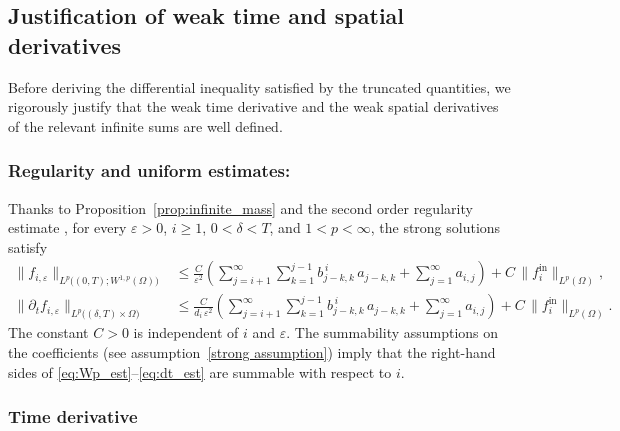 \documentclass[a4paper,12pt,reqno]{amsart}
\theoremstyle{plain}
\numberwithin{equation}{section}
\begin{document}
	\subsection{Justification of weak time and spatial derivatives}
	
	Before deriving the differential inequality satisfied by the truncated
	quantities, we rigorously justify that the weak time derivative and the weak
	spatial derivatives of the relevant infinite sums are well defined.
	
	\subsubsection*{Regularity and uniform estimates:}
	
	Thanks to Proposition~\ref{prop:infinite_mass} and the second order regularity estimate \cite{quittner2007}, for every $\varepsilon>0$,
	$i\ge1$, $0<\delta<T$, and $1<p<\infty$, the strong solutions satisfy
	\begin{align}
		\label{eq:Wp_est}
		\| f_{i,\varepsilon} \|_{L^p\!\big((0,T); W^{1,p}(\Omega)\big)}
		&\le 
		\frac{C}{\varepsilon^{2}}
		\left(
		\sum_{j=i+1}^{\infty}\sum_{k=1}^{j-1}
		b_{j-k,k}^{\,i}\, a_{j-k,k}
		+
		\sum_{j=1}^{\infty} a_{i,j}
		\right)+C\,\| f_i^{\mathrm{in}} \|_{L^{p}(\Omega)},
		\\[1ex]
		\label{eq:dt_est}
		\| \partial_t f_{i,\varepsilon} \|_{L^{p}\!\big((\delta,T)\times\Omega\big)}
		&\le
		\frac{C}{d_i\,\varepsilon^{2}}
		\left(
		\sum_{j=i+1}^{\infty}\sum_{k=1}^{j-1}
		b_{j-k,k}^{\,i}\, a_{j-k,k}
		+
		\sum_{j=1}^{\infty} a_{i,j}
		\right)
		+ C\,\| f_i^{\mathrm{in}} \|_{L^{p}(\Omega)} .
	\end{align}
	The constant $C>0$ is independent of $i$ and $\varepsilon$. The summability assumptions on the coefficients (see assumption~\ref{strong assumption}) imply that the right-hand sides
	of \eqref{eq:Wp_est}--\eqref{eq:dt_est} are summable with respect to $i$.
	
	
	\subsubsection*{Time derivative}
	
\end{document}

